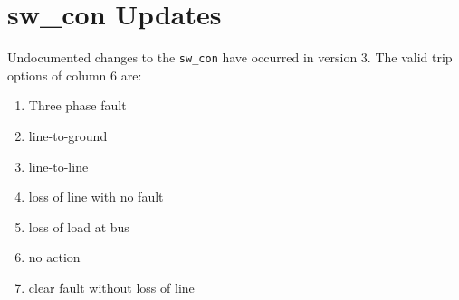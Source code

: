 \section{sw\_con Updates}
Undocumented changes to the \verb|sw_con| have occurred in version 3.
The valid trip options of column 6 are:
\begin{enumerate}
 em
\item Three phase fault
\item line-to-ground
\item line-to-line
\item loss of line with no fault
\item loss of load at bus
\item no action
\item clear fault without loss of line
\end{enumerate}